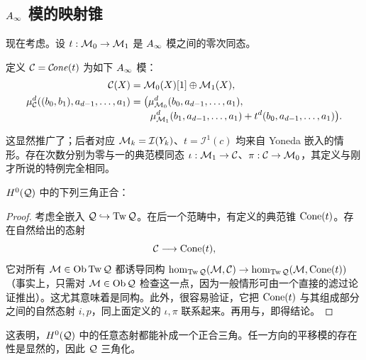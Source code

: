 \subsection{\texorpdfstring{$A_\infty$ 模的映射锥}{A∞ 模的映射锥}}\label{sec:3s}
现在考虑。设 $t:\mathcal M_0\to\mathcal M_1$ 是 $A_\infty$ 模之间的零次同态。
\begin{definition*}
定义 $\mathcal C=\mathcal C\!\mathit{one}(t)$ 为如下 $A_\infty$ 模：
\begin{equation}\label{eq:3.32}
\begin{aligned}
\mathcal C(X)&=\mathcal M_0(X)[1]\oplus\mathcal M_1(X),\\
\mu^d_{\mathcal C}((b_0,b_1),a_{d-1},\ldots,a_1)
&=\bigl(\mu^d_{\mathcal M_0}(b_0,a_{d-1},\ldots,a_1),\\[-2pt]
&\qquad\mu^d_{\mathcal M_1}(b_1,a_{d-1},\ldots,a_1)+t^d(b_0,a_{d-1},\ldots,a_1)\bigr).
\end{aligned}
\end{equation}
\end{definition*}
这显然推广了；后者对应 $\mathcal M_k=\mathcal I(Y_k)$、$t=\mathcal I^1(c)$ 均来自 Yoneda 嵌入的情形。存在次数分别为零与一的典范模同态 $\iota:\mathcal M_1\to\mathcal C$、$\pi:\mathcal C\to\mathcal M_0$，其定义与刚才所说的特例完全相同。
\begin{lemma}\label{st:3.35}
$H^0(\mathcal Q)$ 中的下列三角正合：
\end{lemma}
\begin{proof}
考虑全嵌入 $\mathcal Q\hookrightarrow\operatorname{Tw}\mathcal Q$。在后一个范畴中，有定义的典范锥 $\operatorname{Cone}(t)$。存在自然给出的态射
\begin{equation}\label{eq:3.33}
\mathcal C\longrightarrow\operatorname{Cone}(t),
\end{equation}
它对所有 $\mathcal M\in\operatorname{Ob}\operatorname{Tw}\mathcal Q$ 都诱导同构 $\hom_{\operatorname{Tw}\mathcal Q}(\mathcal M,\mathcal C)\to\hom_{\operatorname{Tw}\mathcal Q}(\mathcal M,\operatorname{Cone}(t))$（事实上，只需对 $\mathcal M\in\operatorname{Ob}\mathcal Q$ 检查这一点，因为一般情形可由一个直接的滤过论证推出）。这尤其意味着是同构。此外，很容易验证，它把 $\operatorname{Cone}(t)$ 与其组成部分之间的自然态射 $i,p$，同上面定义的 $\iota,\pi$ 联系起来。再用与，即得结论。
\end{proof}
这表明，$H^0(\mathcal Q)$ 中的任意态射都能补成一个正合三角。任一方向的平移模的存在性是显然的，因此 $\mathcal Q$ 三角化。

